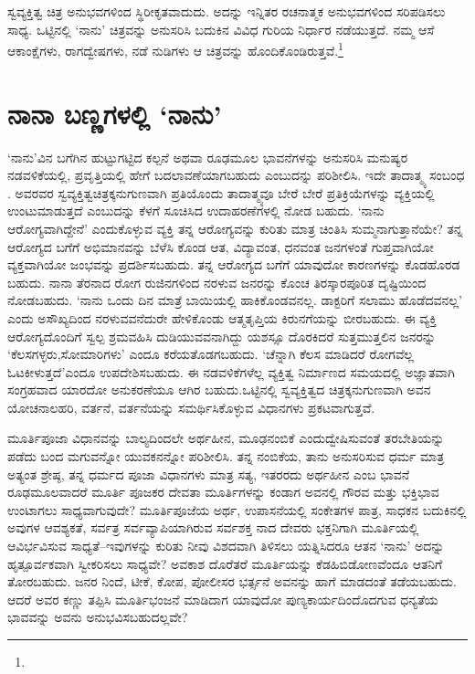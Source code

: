 \vskip 2pt

ಸ್ವವ್ಯಕ್ತಿತ್ವ ಚಿತ್ರ ಅನುಭವಗಳಿಂದ ಸ್ಥಿರೀಕೃತವಾದುದು. ಅದನ್ನು ಇನ್ನಿತರ ರಚನಾತ್ಮಕ ಅನುಭವಗಳಿಂದ ಸರಿಪಡಿಸಲು ಸಾಧ್ಯ. ಒಟ್ಟಿನಲ್ಲಿ ‘ನಾನು’ ಚಿತ್ರವನ್ನು ಅನುಸರಿಸಿ ಬದುಕಿನ ವಿವಿಧ ಗುರಿಯ ನಿರ್ಧಾರ ನಡೆಯುತ್ತದೆ. ನಮ್ಮ ಆಸೆ ಆಕಾಂಕ್ಷೆಗಳು, ರಾಗದ್ವೇಷಗಳು, ನಡೆ ನುಡಿಗಳು ಆ ಚಿತ್ರವನ್ನು ಹೊಂದಿಕೊಂಡಿರುತ್ತವೆ.\footnote{\hfill{}}

\vskip 2pt


\section*{ನಾನಾ ಬಣ್ಣಗಳಲ್ಲಿ ‘ನಾನು’}


‘ನಾನು’ವಿನ ಬಗೆಗಿನ ಹುಟ್ಟುಗಟ್ಟಿದ ಕಲ್ಪನೆ ಅಥವಾ ರೂಢಮೂಲ ಭಾವನೆಗಳನ್ನು ಅನುಸರಿಸಿ ಮನುಷ್ಯರ ನಡವಳಿಕೆಯಲ್ಲಿ, ಪ್ರವೃತ್ತಿಯಲ್ಲಿ ಹೇಗೆ ಬದಲಾವಣೆಯಾಗಬಹುದು ಎಂಬುದನ್ನು ಪರಿಶೀಲಿಸಿ. ಇದೇ ತಾದಾತ್ಮ್ಯ ಸಂಬಂಧ . ಅವರವರ ಸ್ವವ್ಯಕ್ತಿತ್ವಚಿತ್ರಕ್ಕನುಗುಣವಾಗಿ ಪ್ರತಿಯೊಂದು ತಾದಾತ್ಮ್ಯವೂ ಬೇರೆ ಬೇರೆ ಪ್ರತಿಕ್ರಿಯೆಗಳನ್ನು ವ್ಯಕ್ತಿಯಲ್ಲಿ ಉಂಟುಮಾಡುತ್ತದೆ ಎಂಬುದನ್ನು ಕೆಳಗೆ ಸೂಚಿಸಿದ ಉದಾಹರಣೆಗಳಲ್ಲಿ ನೋಡ ಬಹುದು. ‘ನಾನು ಆರೋಗ್ಯವಾಗಿದ್ದೇನೆ’ ಎಂದುಕೊಳ್ಳುವ ವ್ಯಕ್ತಿ ತನ್ನ ಆರೋಗ್ಯವನ್ನು ಕುರಿತು ಮಾತ್ರ ಚಿಂತಿಸಿ ಸುಮ್ಮನಾಗುತ್ತಾನೆಯೇ? ತನ್ನ ಆರೋಗ್ಯದ ಬಗೆಗೆ ಅಭಿಮಾನವನ್ನು ಬೆಳೆಸಿ ಕೊಂಡ ಆತ, ವಿದ್ಯಾವಂತ, ಧನವಂತ ಜನಗಳಂತೆ ಗುಪ್ತವಾಗಿಯೋ ವ್ಯಕ್ತವಾಗಿಯೋ ಜಂಭವನ್ನು ಪ್ರದರ್ಶಿಸಬಹುದು. ತನ್ನ ಆರೋಗ್ಯದ ಬಗೆಗೆ ಯಾವುದೋ ಕಾರಣಗಳನ್ನು ಕೊಡಹೊರಡ ಬಹುದು. ನಾನಾ ತೆರನಾದ ರೋಗ ರುಜಿನಗಳಿಂದ ನರಳುವ ಜನರನ್ನು ಕೊಂಚ ತಿರಸ್ಕಾರಪೂರಿತ ದೃಷ್ಟಿಯಿಂದ ನೋಡಬಹುದು. ‘ನಾನು ಒಂದು ದಿನ ಮಾತ್ರೆ ಬಾಯಿಯಲ್ಲಿ ಹಾಕಿಕೊಂಡವನಲ್ಲ. ಡಾಕ್ಟರಿಗೆ ಸಲಾಮು ಹೊಡೆದವನಲ್ಲ’ ಎಂದು ಅಸೌಖ್ಯದಿಂದ ನರಳುವವನೆದುರೇ ಹೇಳಿಕೊಂಡು ಆತ್ಮತೃಪ್ತಿಯ ಕಿರುನಗೆಯನ್ನು ಬೀರಬಹುದು. ಈ ವ್ಯಕ್ತಿ ಆರೋಗ್ಯದೊಂದಿಗೆ ಸ್ವಲ್ಪ ಶ್ರಮವಹಿಸಿ ದುಡಿಯುವವನಾಗಿದ್ದು ಯಶಸ್ಸೂ ದೊರಕಿದರೆ ಸುತ್ತಮುತ್ತಲಿನ ಜನರನ್ನು ‘ಕೆಲಸಗಳ್ಳರು,\break ಸೋಮಾರಿಗಳು’ ಎಂದೂ ಕರೆಯತೊಡಗಬಹುದು. ‘ಚೆನ್ನಾಗಿ ಕೆಲಸ ಮಾಡಿದರೆ ರೋಗವೆಲ್ಲ ಓಟಕೀಳುತ್ತದೆ’ಎಂದೂ ಉಪದೇಶಿಸಬಹುದು. ಈ ನಡವಳಿಕೆಗಳೆಲ್ಲ ವ್ಯಕ್ತಿತ್ವ ನಿರ್ಮಾಣದ ಸಮಯದಲ್ಲಿ ಅಜ್ಞಾತವಾಗಿ ಸಂಗ್ರಹವಾದ ಯಾರದೋ ಅನುಕರಣೆಯೂ ಆಗಿರ ಬಹುದು.\break ಒಟ್ಟಿನಲ್ಲಿ ಸ್ವವ್ಯಕ್ತಿತ್ವದ ಚಿತ್ರಕ್ಕನುಗುಣವಾಗಿ ಅವನ ಯೋಚನಾಲಹರಿ, ವರ್ತನೆ, ವರ್ತನೆಯನ್ನು ಸಮರ್ಥಿಸಿಕೊಳ್ಳುವ ವಿಧಾನಗಳು ಪ್ರಕಟವಾಗುತ್ತವೆ.

ಮೂರ್ತಿಪೂಜಾ ವಿಧಾನವನ್ನು ಬಾಲ್ಯದಿಂದಲೇ ಅರ್ಥಹೀನ, ಮೂಢನಂಬಿಕೆ ಎಂದು\break ದ್ವೇಷಿಸುವಂತೆ ತರಬೇತಿಯನ್ನು ಪಡೆದು ಬಂದ ಮಗುವನ್ನೋ ಯುವಕನನ್ನೋ ಪರಿಶೀಲಿಸಿ. ತನ್ನ ನಂಬಿಕೆಯ, ತಾನು ಅನುಸರಿಸುವ ಧರ್ಮ ಮಾತ್ರ ಅತ್ಯಂತ ಶ್ರೇಷ್ಠ, ತನ್ನ ಧರ್ಮದ ಪೂಜಾ ವಿಧಾನಗಳು ಮಾತ್ರ ಸತ್ಯ, ಇತರರದು ಅರ್ಥಹೀನ ಎಂಬ ಭಾವನೆ ರೂಢಮೂಲವಾದರೆ ಮೂರ್ತಿ ಪೂಜಕರ ದೇವತಾ ಮೂರ್ತಿಗಳನ್ನು ಕಂಡಾಗ ಅವನಲ್ಲಿ ಗೌರವ ಮತ್ತು ಭಕ್ತಿಭಾವ ಉಂಟಾಗಲು ಸಾಧ್ಯವಾಗುವುದೇ? ಮೂರ್ತಿಪೂಜೆಯ ಅರ್ಥ, ಉಪಾಸನೆಯಲ್ಲಿ ಸಂಕೇತಗಳ ಪಾತ್ರ, ಸಾಧಕನ ಬದುಕಿನಲ್ಲಿ ಅವುಗಳ ಆವಶ್ಯಕತೆ, ಸರ್ವತ್ರ ಸರ್ವವ್ಯಾಪಿಯಾಗಿರುವ ಸರ್ವಶಕ್ತ ನಾದ ದೇವರು ಭಕ್ತನಿಗಾಗಿ ಮೂರ್ತಿಯಲ್ಲಿ ಆವಿರ್ಭವಿಸುವ ಸಾಧ್ಯತೆ–ಇವುಗಳನ್ನು ಕುರಿತು ನೀವು ವಿಶದವಾಗಿ ತಿಳಿಸಲು ಯತ್ನಿಸಿದರೂ ಆತನ ‘ನಾನು’ ಅದನ್ನು ಹೃತ್ಪೂರ್ವಕವಾಗಿ ಸ್ವೀಕರಿಸಲು ಸಾಧ್ಯವೇ? ಅವಕಾಶ ದೊರೆತರೆ ಮೂರ್ತಿಯನ್ನು ಕೆಡಹಿಬಿಡೋಣವೆಂದೂ ಆತನಿಗೆ ತೋರಬಹುದು. ಜನರ ನಿಂದೆ, ಟೀಕೆ, ಕೋಪ, ಪೋಲೀಸರ ಭರ್ತ್ಸನೆ ಅವನನ್ನು ಹಾಗೆ ಮಾಡದಂತೆ ತಡೆಯಬಹುದು. ಆದರೆ ಅವರ ಕಣ್ಣು ತಪ್ಪಿಸಿ ಮೂರ್ತಿಭಂಜನೆ ಮಾಡಿದಾಗ ಯಾವುದೋ ಪುಣ್ಯಕಾರ್ಯದಿಂದೊದಗುವ ಧನ್ಯತೆಯ ಭಾವವನ್ನು ಅವನು ಅನುಭವಿಸಬಹುದಲ್ಲವೇ?

